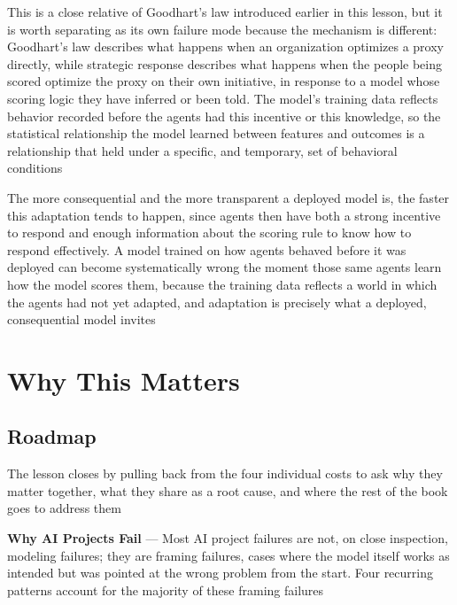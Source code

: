 This is a close relative of Goodhart's law introduced earlier in this lesson,
but it is worth separating as its own failure mode because the mechanism is
different: Goodhart's law describes what happens when an organization optimizes a
proxy directly, while strategic response describes what happens when the people
being scored optimize the proxy on their own initiative, in response to a model whose
scoring logic they have inferred or been told. The model's training data
reflects behavior recorded before the agents had this incentive or this
knowledge, so the statistical relationship the model learned between features and
outcomes is a relationship that held under a specific, and temporary, set of behavioral
conditions

The more consequential and the more transparent a deployed model is, the faster this
adaptation tends to happen, since agents then have both a strong incentive to
respond and enough information about the scoring rule to know how to respond
effectively. A model trained on how agents behaved before it was deployed can become
systematically wrong the moment those same agents learn how the model scores them,
because the training data reflects a world in which the agents had not yet
adapted, and adaptation is precisely what a deployed, consequential model
invites

\section{Why This Matters}
\label{chap:why-this-matters}

\subsection{Roadmap}
\label{sec:why-this-matters-roadmap}

The lesson closes by pulling back from the four individual costs to ask why they
matter together, what they share as a root cause, and where the rest of the book
goes to address them

\textbf{Why AI Projects Fail} --- Most AI project failures are not, on close
inspection, modeling failures; they are framing failures, cases where the model itself
works as intended but was pointed at the wrong problem from the start. Four
recurring patterns account for the majority of these framing failures

